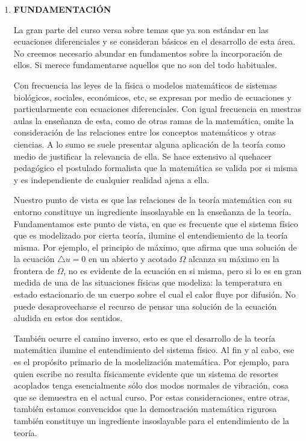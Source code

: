 \documentclass[12pt]{article}
\begin{document}
\begin{enumerate}
 
 \item\textbf{ FUNDAMENTACIÓN }

	La gran parte del curso versa sobre temas que ya son estándar en las ecuaciones diferenciales y se consideran básicos en el desarrollo de esta área. No creemos necesario abundar en fundamentos sobre la incorporación de ellos. Si merece fundamentarse aquellos que no son del todo habituales.

	Con frecuencia las leyes de la física o modelos matemáticos de sistemas biológicos, sociales, económicos, etc, se expresan por medio de ecuaciones y particularmente con ecuaciones diferenciales. Con igual frecuencia en nuestras aulas la enseñanza de esta, como de otras  ramas de la matemática, omite la consideración de las relaciones entre los conceptos matemáticos y otras ciencias. A lo sumo se suele presentar alguna aplicación de la teoría como medio de justificar la relevancia de ella. Se hace extensivo al quehacer pedagógico  el postulado formalista que la matemática se valida por si misma y es independiente de cualquier  realidad ajena a ella.

	Nuestro punto de vista es que las relaciones de la teoría matemática con su entorno constituye un ingrediente insoslayable en la enseñanza de la teoría.  Fundamentamos este punto de vista, en que es frecuente que el sistema físico  que es modelizado por cierta teoría, ilumine el entendiemiento de la teoría misma. Por ejemplo, el principio de máximo, que afirma que una solución de la ecuación $\triangle u=0$ en un abierto y acotado $\Omega$ alcanza su máximo en la frontera de $\Omega$, no es evidente de la ecuación en si misma, pero si lo es en gran medida de una de las situaciones físicas que modeliza:  la temperatura en estado estacionario de un cuerpo sobre el cual el calor fluye por difusión. No puede desaprovecharse el recurso de pensar una solución de la ecuación aludida en estos dos sentidos.

	También ocurre el camino inverso, esto es que el desarrollo de la teoría matemática ilumine el entendimiento del sistema físico. Al fin y al cabo, ese es el propósito primario de la modelización matemática. Por ejemplo, para quien escribe no resulta físicamente evidente que un sistema de resortes acoplados tenga esencialmente sólo dos modos normales de vibración, cosa que se demuestra en el actual curso. Por estas consideraciones, entre otras, también estamos convencidos que la demostración matemática rigurosa también constituye un ingrediente insoslayable para el entendimiento de la teoría.


\end{enumerate}
\end{document}
